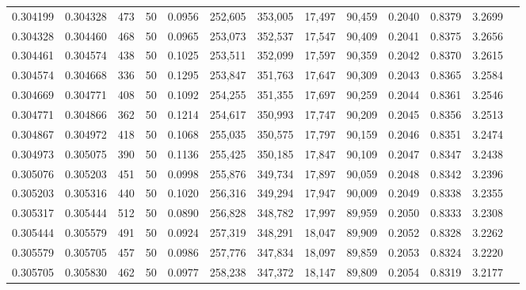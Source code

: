 \begin{tabular}{rrrrrrrrrrrrr}
0.304199 & 0.304328 &   473 &  50 &                                     0.0956 & 252,605 & 353,005 &  17,497 &  90,459 & 0.2040 & 0.8379 & 3.2699 \\
0.304328 & 0.304460 &   468 &  50 &                                     0.0965 & 253,073 & 352,537 &  17,547 &  90,409 & 0.2041 & 0.8375 & 3.2656 \\
0.304461 & 0.304574 &   438 &  50 &                                     0.1025 & 253,511 & 352,099 &  17,597 &  90,359 & 0.2042 & 0.8370 & 3.2615 \\
0.304574 & 0.304668 &   336 &  50 &                                     0.1295 & 253,847 & 351,763 &  17,647 &  90,309 & 0.2043 & 0.8365 & 3.2584 \\
0.304669 & 0.304771 &   408 &  50 &                                     0.1092 & 254,255 & 351,355 &  17,697 &  90,259 & 0.2044 & 0.8361 & 3.2546 \\
0.304771 & 0.304866 &   362 &  50 &                                     0.1214 & 254,617 & 350,993 &  17,747 &  90,209 & 0.2045 & 0.8356 & 3.2513 \\
0.304867 & 0.304972 &   418 &  50 &                                     0.1068 & 255,035 & 350,575 &  17,797 &  90,159 & 0.2046 & 0.8351 & 3.2474 \\
0.304973 & 0.305075 &   390 &  50 &                                     0.1136 & 255,425 & 350,185 &  17,847 &  90,109 & 0.2047 & 0.8347 & 3.2438 \\
0.305076 & 0.305203 &   451 &  50 &                                     0.0998 & 255,876 & 349,734 &  17,897 &  90,059 & 0.2048 & 0.8342 & 3.2396 \\
0.305203 & 0.305316 &   440 &  50 &                                     0.1020 & 256,316 & 349,294 &  17,947 &  90,009 & 0.2049 & 0.8338 & 3.2355 \\
0.305317 & 0.305444 &   512 &  50 &                                     0.0890 & 256,828 & 348,782 &  17,997 &  89,959 & 0.2050 & 0.8333 & 3.2308 \\
0.305444 & 0.305579 &   491 &  50 &                                     0.0924 & 257,319 & 348,291 &  18,047 &  89,909 & 0.2052 & 0.8328 & 3.2262 \\
0.305579 & 0.305705 &   457 &  50 &                                     0.0986 & 257,776 & 347,834 &  18,097 &  89,859 & 0.2053 & 0.8324 & 3.2220 \\
0.305705 & 0.305830 &   462 &  50 &                                     0.0977 & 258,238 & 347,372 &  18,147 &  89,809 & 0.2054 & 0.8319 & 3.2177 \\

\end{tabular}
